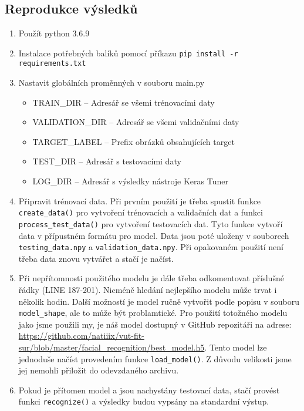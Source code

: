 \documentclass[a4paper,11pt]{article}
\begin{document}
		\subsection{Reprodukce výsledků}
			\begin{enumerate}
				\item Použít python 3.6.9
				\item Instalace potřebných balíků pomocí příkazu \texttt{pip install -r requirements.txt}
				\item Nastavit globálních proměnných v souboru main.py
					\begin{itemize}
						\item TRAIN\_DIR -- Adresář se všemi trénovacími daty
						\item VALIDATION\_DIR -- Adresář se všemi validačními daty
						\item TARGET\_LABEL -- Prefix obrázků obsahujících target
						\item TEST\_DIR -- Adresář s testovacími daty
						\item LOG\_DIR -- Adresář s výsledky nástroje Keras Tuner
					\end{itemize}
				\item Připravit trénovací data. Při prvním použití je třeba spustit funkce \texttt{create\_data()} pro vytvoření trénovacích a validačních dat a funkci \texttt{process\_test\_data()} pro vytvoření testovacích dat. Tyto funkce vytvoří data v přípustném formátu pro model. Data jsou poté uloženy v souborech \texttt{testing\_data.npy} a \texttt{validation\_data.npy}. Při opakovaném použití není třeba data znovu vytvářet a stačí je načíst.
				\item Při nepřítomnosti použitého modelu je dále třeba odkomentovat příslušné řádky (LINE 187-201). Nicméně hledání nejlepšího modelu může trvat i několik hodin. Další možností je model ručně vytvořit podle popisu v souboru \texttt{model\_shape}, ale to může být problamtické. Pro použití totožného modelu jako jsme použili my, je náš model dostupný v GitHub repozitáři na adrese: \url{https://github.com/natiiix/vut-fit-sur/blob/master/facial_recognition/best_model.h5}. Tento model lze jednoduše načíst provedením funkce \texttt{load\_model()}. Z důvodu velikosti jsme jej nemohli přiložit do odevzdaného archivu.
				\item Pokud je přítomen model a jsou nachystány testovací data, stačí provést funkci \texttt{recognize()} a výsledky budou vypsány na standardní výstup. 
			\end{enumerate}
		
\end{document}
